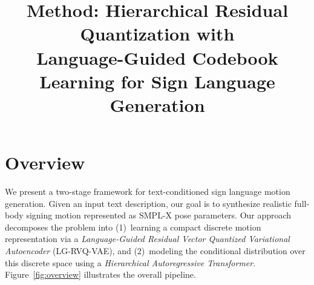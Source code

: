 \documentclass[10pt,twocolumn]{article}
\title{\vspace{-1.5em}\textbf{Method: Hierarchical Residual Quantization with\\Language-Guided Codebook Learning for Sign Language Generation}}
\author{}
\date{}
\begin{document}
\maketitle
\vspace{-2em}

\section{Overview}

We present a two-stage framework for text-conditioned sign language motion generation. Given an input text description, our goal is to synthesize realistic full-body signing motion represented as SMPL-X pose parameters. Our approach decomposes the problem into (1)~learning a compact discrete motion representation via a \emph{Language-Guided Residual Vector Quantized Variational Autoencoder} (LG-RVQ-VAE), and (2)~modeling the conditional distribution over this discrete space using a \emph{Hierarchical Autoregressive Transformer}. Figure~\ref{fig:overview} illustrates the overall pipeline.
\end{document}

